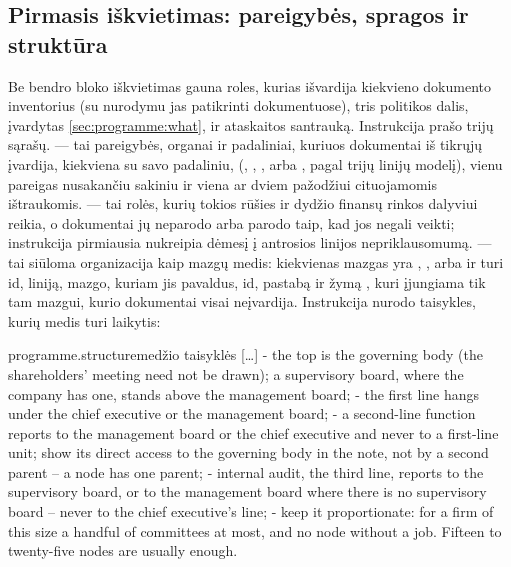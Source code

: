 \subsection{Pirmasis iškvietimas: pareigybės, spragos ir struktūra}

Be bendro bloko iškvietimas gauna roles, kurias išvardija kiekvieno dokumento inventorius (su
nurodymu jas patikrinti dokumentuose), tris politikos dalis, įvardytas
\cref{sec:programme:what}, ir ataskaitos santrauką. Instrukcija 
prašo trijų sąrašų.  --- tai pareigybės, organai ir padaliniai, kuriuos
dokumentai iš tikrųjų įvardija, kiekviena su savo padaliniu,  (,
, ,  arba , pagal trijų linijų modelį),
vienu pareigas nusakančiu sakiniu ir viena ar dviem pažodžiui cituojamomis ištraukomis.
 --- tai rolės, kurių tokios rūšies ir dydžio finansų rinkos dalyviui reikia, o
dokumentai jų neparodo arba parodo taip, kad jos negali veikti; instrukcija pirmiausia
nukreipia dėmesį į antrosios linijos nepriklausomumą.  --- tai siūloma
organizacija kaip mazgų medis: kiekvienas mazgas yra , ,
 arba  ir turi id, liniją, mazgo, kuriam jis pavaldus, id, pastabą ir
žymą , kuri įjungiama tik tam mazgui, kurio dokumentai visai neįvardija.
Instrukcija nurodo taisykles, kurių medis turi laikytis:

\begin{promptexcerpt}{programme.structure}{medžio taisyklės}
[…]
   - the top is the governing body (the shareholders' meeting need not be drawn); a supervisory board, where the company has one, stands above the management board;
   - the first line hangs under the chief executive or the management board;
   - a second-line function reports to the management board or the chief executive and never to a first-line unit; show its direct access to the governing body in the note, not by a second parent – a node has one parent;
   - internal audit, the third line, reports to the supervisory board, or to the management board where there is no supervisory board – never to the chief executive's line;
   - keep it proportionate: for a firm of this size a handful of committees at most, and no node without a job. Fifteen to twenty-five nodes are usually enough.
\end{promptexcerpt}

